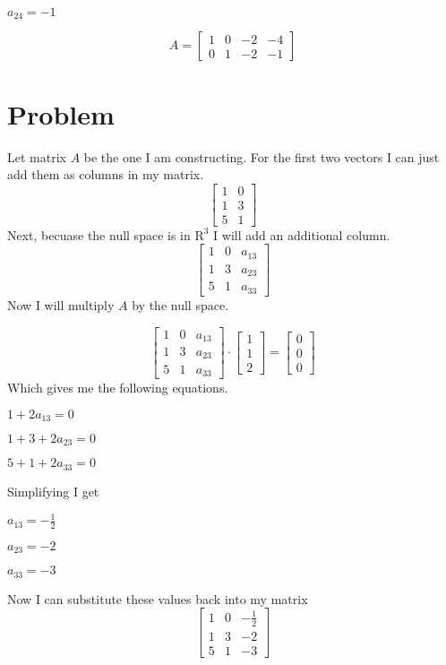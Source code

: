 \documentclass{article}
\begin{document}
$a_{24} = -1$

\[
A = 
\begin{bmatrix}
1 & 0 & -2 & -4 \\
0 & 1 & -2 & -1
\end{bmatrix}
\]
\section{Problem}
Let matrix $A$ be the one I am constructing. For the first two vectors I can just add them as columns in my matrix.
\[
\begin{bmatrix}
1 & 0 \\
1 & 3 \\
5 & 1  
\end{bmatrix}
\]
Next, becuase the null space is in $\textrm{R}^{3}$ I will add an additional column.
\[
\begin{bmatrix}
1 & 0 & a_{13} \\
1 & 3 & a_{23} \\
5 & 1 & a_{33} 
\end{bmatrix}
\]
Now I will multiply $A$ by the null space.

\[
\begin{bmatrix}
1 & 0 & a_{13} \\
1 & 3 & a_{23} \\
5 & 1 & a_{33} 
\end{bmatrix}
\cdot
\begin{bmatrix}
1 \\
1 \\
2 
\end{bmatrix}
=
\begin{bmatrix}
0 \\
0 \\
0 
\end{bmatrix}
\]
Which gives me the following equations.

$1 + 2a_{13} = 0$

$1 + 3 + 2a_{23} = 0$

$5 + 1 + 2a_{33} = 0$

Simplifying I get

$a_{13} = -\frac{1}{2}$

$a_{23} = -2$

$a_{33} = -3$

Now I can substitute these values back into my matrix
\[
\begin{bmatrix}
1 & 0 & -\frac{1}{2} \\
1 & 3 & -2 \\
5 & 1 & -3 
\end{bmatrix}
\]
\end{document}

